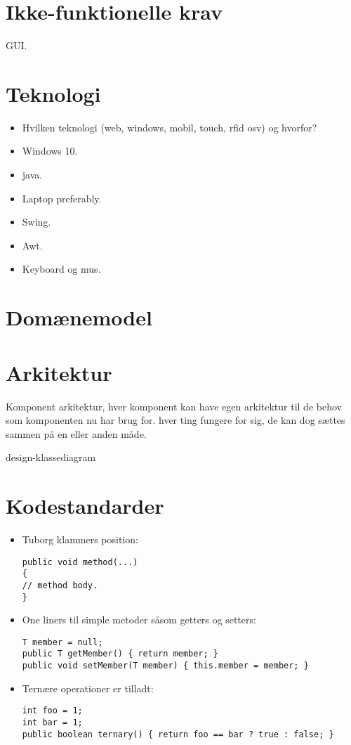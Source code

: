 \documentclass[11pt]{article}
\begin{document}
\section{Ikke-funktionelle krav}
\label{sec:org967f29a}
GUI.

\section{Teknologi}
\label{sec:org2c7e3c6}
\begin{itemize}
\item Hvilken teknologi (web, windows, mobil, touch, rfid osv) og hvorfor?
\item Windows 10.
\item java.
\item Laptop preferably.
\item Swing.
\item Awt.
\item Keyboard og mus.
\end{itemize}


\section{Domænemodel}
\label{sec:orgceae129}

\section{Arkitektur}
\label{sec:orgbeade2b}
Komponent arkitektur, hver komponent kan have egen arkitektur til de behov som komponenten nu har brug for. hver ting fungere for sig, de kan dog sættes sammen på en eller anden måde.

design-klassediagram 

\section{Kodestandarder}
\label{sec:orgd03d836}
\begin{itemize}
\item Tuborg klammers position:
\begin{verbatim}
public void method(...)
{
// method body.
}
\end{verbatim}

\item One liners til simple metoder såsom getters og setters:
\begin{verbatim}
T member = null;
public T getMember() { return member; }
public void setMember(T member) { this.member = member; }
\end{verbatim}

\item Ternære operationer er tilladt:
\begin{verbatim}
int foo = 1;
int bar = 1;
public boolean ternary() { return foo == bar ? true : false; }
\end{verbatim}
\end{itemize}
\end{document}
